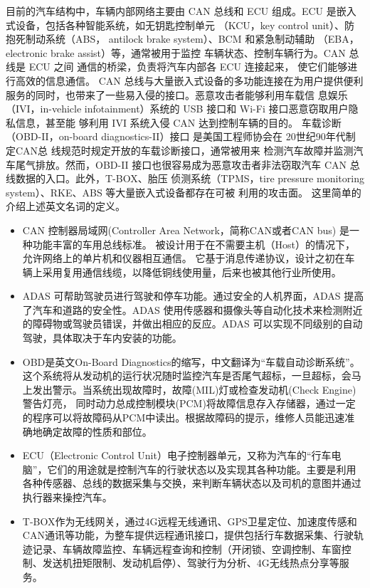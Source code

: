 目前的汽车结构中，车辆内部网络主要由 CAN
总线和 ECU 组成。ECU 是嵌入式设备，包括各种智能系统，如无钥匙控制单元
（KCU，key control unit）、防抱死制动系统（ABS，
antilock brake system）、BCM 和紧急制动辅助
（EBA，electronic brake assist）等，通常被用于监控
车辆状态、控制车辆行为。CAN 总线是 ECU 之间
通信的桥梁，负责将汽车内部各 ECU 连接起来，
使它们能够进行高效的信息通信。
\newline
CAN 总线与大量嵌入式设备的多功能连接在为用户提供便利服务的同时，也带来了一些易入侵的接口。恶意攻击者能够利用车载信
息娱乐（IVI，in-vehicle infotainment）系统的 USB
接口和 Wi-Fi 接口恶意窃取用户隐私信息，甚至能
够利用 IVI 系统入侵 CAN 达到控制车辆的目的。
车载诊断（OBD-II，on-board diagnostics-II）接口
是美国工程师协会在 20世纪90年代制定CAN总
线规范时规定开放的车载诊断接口，通常被用来
检测汽车故障并监测汽车尾气排放。然而，OBD-II 接口也很容易成为恶意攻击者非法窃取汽车 CAN 总线数据的入口。此外，T-BOX、胎压
侦测系统（TPMS，tire pressure monitoring system）、RKE、ABS 等大量嵌入式设备都存在可被
利用的攻击面。
这里简单的介绍上述英文名词的定义。
\begin{itemize}
    \item CAN 控制器局域网(Controller Area Network，简称CAN或者CAN bus) 是一种功能丰富的车用总线标准。 
    被设计用于在不需要主机（Host）的情况下，允许网络上的单片机和仪器相互通信。 
    它基于消息传递协议，设计之初在车辆上采用复用通信线缆，以降低铜线使用量，后来也被其他行业所使用。
    \item ADAS 可帮助驾驶员进行驾驶和停车功能。通过安全的人机界面，ADAS 提高了汽车和道路的安全性。ADAS 使用传感器和摄像头等自动化技术来检测附近的障碍物或驾驶员错误，并做出相应的反应。ADAS 可以实现不同级别的自动驾驶，具体取决于车内安装的功能。
    \item OBD是英文On-Board Diagnostics的缩写，中文翻译为“车载自动诊断系统”。这个系统将从发动机的运行状况随时监控汽车是否尾气超标，一旦超标，会马上发出警示。当系统出现故障时，故障(MIL)灯或检查发动机(Check Engine)警告灯亮，
    同时动力总成控制模块(PCM)将故障信息存入存储器，通过一定的程序可以将故障码从PCM中读出。根据故障码的提示，维修人员能迅速准确地确定故障的性质和部位。
    \item ECU（Electronic Control Unit）电子控制器单元，又称为汽车的“行车电脑”，它们的用途就是控制汽车的行驶状态以及实现其各种功能。主要是利用各种传感器、总线的数据采集与交换，来判断车辆状态以及司机的意图并通过执行器来操控汽车。
    \item T-BOX作为无线网关，通过4G远程无线通讯、GPS卫星定位、加速度传感和CAN通讯等功能，为整车提供远程通讯接口，提供包括行车数据采集、行驶轨迹记录、车辆故障监控、车辆远程查询和控制（开闭锁、空调控制、车窗控制、发送机扭矩限制、发动机启停）、驾驶行为分析、4G无线热点分享等服务。
\end{itemize}
